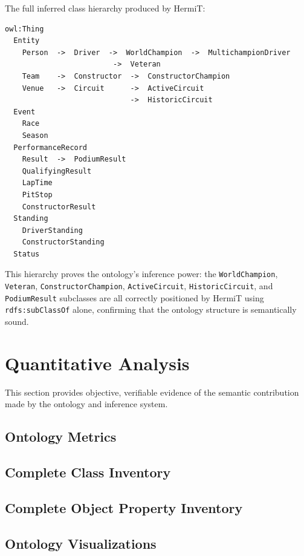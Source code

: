 \documentclass[12pt,a4paper]{article}
\begin{document}
The full inferred class hierarchy produced by HermiT:

\begin{lstlisting}[style=shell, caption={Class hierarchy inferred by HermiT from owl:equivalentClass + rdfs:subClassOf axioms}]
owl:Thing
  Entity
    Person  ->  Driver  ->  WorldChampion  ->  MultichampionDriver
                         ->  Veteran
    Team    ->  Constructor  ->  ConstructorChampion
    Venue   ->  Circuit      ->  ActiveCircuit
                             ->  HistoricCircuit
  Event
    Race
    Season
  PerformanceRecord
    Result  ->  PodiumResult
    QualifyingResult
    LapTime
    PitStop
    ConstructorResult
  Standing
    DriverStanding
    ConstructorStanding
  Status
\end{lstlisting}

This hierarchy proves the ontology's inference power: the
\texttt{WorldChampion}, \texttt{Veteran}, \texttt{ConstructorChampion},
\texttt{ActiveCircuit}, \texttt{HistoricCircuit}, and \texttt{PodiumResult}
subclasses are all correctly positioned by HermiT using
\texttt{rdfs:subClassOf} alone, confirming that the ontology structure is
semantically sound.

\section{Quantitative Analysis}
\label{sec:metrics}

This section provides objective, verifiable evidence of the semantic contribution
made by the ontology and inference system.

\subsection{Ontology Metrics}



\subsection{Complete Class Inventory}



\subsection{Complete Object Property Inventory}



\subsection{Ontology Visualizations}
\label{sec:diagrams}
\end{document}
